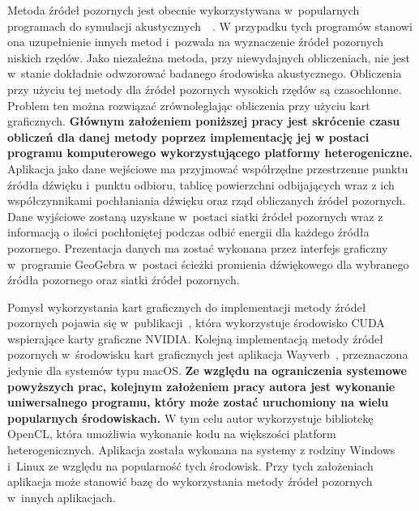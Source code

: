 Metoda źródeł pozornych jest obecnie wykorzystywana w~popularnych programach do symulacji akustycznych~\cite{b7}~\cite{b8}. W przypadku tych programów stanowi ona uzupełnienie innych metod i~pozwala na wyznaczenie źródeł pozornych niskich rzędów. Jako niezależna metoda, przy niewydajnych obliczeniach, nie jest w~stanie dokładnie odwzorować badanego środowiska akustycznego. Obliczenia przy użyciu tej metody dla źródeł pozornych wysokich rzędów są czasochłonne. Problem ten można rozwiązać zrównoleglając obliczenia przy użyciu kart graficznych. \textbf{Głównym założeniem poniższej pracy jest skrócenie czasu obliczeń dla danej metody poprzez implementację jej w postaci programu komputerowego wykorzystującego platformy heterogeniczne.} Aplikacja jako dane wejściowe ma przyjmować współrzędne przestrzenne punktu źródła dźwięku i~punktu odbioru, tablicę powierzchni odbijających wraz z ich współczynnikami pochłaniania dźwięku oraz rząd obliczanych źródeł pozornych. Dane wyjściowe zostaną uzyskane w~postaci siatki źródeł pozornych wraz z informacją o ilości pochłoniętej podczas odbić energii dla każdego źródła pozornego. Prezentacja danych ma zostać wykonana przez interfejs graficzny w~programie GeoGebra w~postaci ścieżki promienia dźwiękowego dla wybranego źródła pozornego oraz siatki źródeł pozornych.

Pomysł  wykorzystania kart graficznych do implementacji metody źródeł pozornych pojawia się w~publikacji~\cite{b9}, która wykorzystuje środowisko CUDA wspierające karty graficzne NVIDIA. Kolejną implementacją metody źródeł pozornych w~środowisku kart graficznych jest aplikacja Wayverb~\cite{b10}, przeznaczona jedynie dla systemów typu macOS. \textbf{Ze względu na ograniczenia systemowe powyższych prac, kolejnym założeniem pracy autora jest wykonanie uniwersalnego programu, który może zostać uruchomiony na wielu popularnych środowiskach.} W tym celu autor wykorzystuje bibliotekę OpenCL, która umożliwia wykonanie kodu na większości platform heterogenicznych. Aplikacja została wykonana na systemy z rodziny Windows i~Linux ze względu na popularność tych środowisk. Przy tych założeniach aplikacja może stanowić bazę do wykorzystania metody źródeł pozornych w~innych aplikacjach.


















